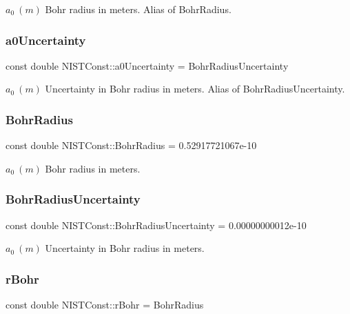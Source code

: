 $a_0 \ (m)$ Bohr radius in meters. Alias of Bohr\+Radius. \mbox{\label{group___bohr_radius_ga69cffcfd4d8bdc8525818d56ac079b8d}} 
\subsubsection{\texorpdfstring{a0\+Uncertainty}{a0Uncertainty}}
{\footnotesize\ttfamily const double N\+I\+S\+T\+Const\+::a0\+Uncertainty = Bohr\+Radius\+Uncertainty}

$a_0 \ (m)$ Uncertainty in Bohr radius in meters. Alias of Bohr\+Radius\+Uncertainty. \mbox{\label{group___bohr_radius_ga38bdb86c2f3e484e8b164e75a3980638}} 
\subsubsection{\texorpdfstring{Bohr\+Radius}{BohrRadius}}
{\footnotesize\ttfamily const double N\+I\+S\+T\+Const\+::\+Bohr\+Radius = 0.\+52917721067e-\/10}

$a_0 \ (m)$ Bohr radius in meters. \mbox{\label{group___bohr_radius_gad031da8c7a2e239441e06c10fd8f6f07}} 
\subsubsection{\texorpdfstring{Bohr\+Radius\+Uncertainty}{BohrRadiusUncertainty}}
{\footnotesize\ttfamily const double N\+I\+S\+T\+Const\+::\+Bohr\+Radius\+Uncertainty = 0.\+00000000012e-\/10}

$a_0 \ (m)$ Uncertainty in Bohr radius in meters. \mbox{\label{group___bohr_radius_gad2a74a106c13086263e42411835b6352}} 
\subsubsection{\texorpdfstring{r\+Bohr}{rBohr}}
{\footnotesize\ttfamily const double N\+I\+S\+T\+Const\+::r\+Bohr = Bohr\+Radius}

